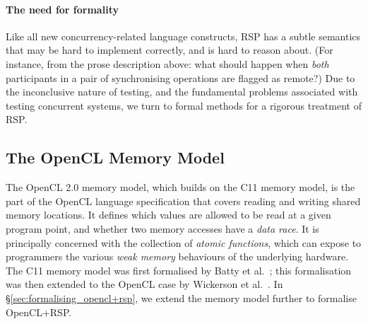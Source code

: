 \documentclass[svgnames,10pt]{sigplanconf}
\theoremstyle{definition}
\begin{document}
\paragraph{The need for formality}
Like all new concurrency-related language constructs,
RSP has a subtle semantics that may be hard to implement correctly,
and is hard to reason about. (For instance, from the prose description
above: what should happen when \emph{both} participants in a pair of
synchronising operations are flagged as
remote?) Due to the inconclusive nature of testing, and the fundamental
problems associated with testing concurrent systems, we turn to formal
methods for a rigorous treatment of RSP.

\subsection{The OpenCL Memory Model}
\label{sec:formalising_opencl}

The OpenCL 2.0 memory model, which builds on the C11 memory model, is
the part of the OpenCL language specification that covers reading and
writing shared memory locations. It defines which values are allowed
to be read at a given program point, and whether two memory accesses
have a \emph{data race}. It is principally concerned with the
collection of \emph{atomic functions}, which can expose to programmers
the various \emph{weak memory} behaviours of the underlying hardware.
The C11 memory model was first formalised by Batty et
al.~\cite{batty+11}; this formalisation was then extended to the
OpenCL case by Wickerson et al.~\cite{wickerson+15}. In
\S\ref{sec:formalising_opencl+rsp}, we extend the memory model
further to formalise OpenCL+RSP.
\end{document}
